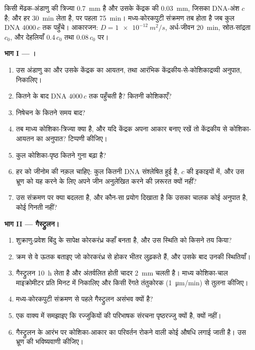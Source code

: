 \begin{problem}
\label{pb:b2:vertebrate-development:1}
किसी मेंढक-अंडाणु की त्रिज्या \qty{0.7}{mm} है और उसके केंद्रक की
\qty{0.03}{mm}, जिसका DNA-अंश $c$ है; और हर 
\qty{30}{min} लेता है, पर पहला \qty{75}{min}। मध्य-कोरकपुटी
संक्रमण तब होता है जब कुल DNA $4000\,c$ तक पहुँचे। आकारजन: $D =
\qty{1e-12}{m^2/s}$, अर्ध-जीवन \qty{20}{min}, स्रोत-सांद्रता
$c_0$, और देहलियाँ $0.4\,c_0$ तथा $0.08\,c_0$ पर।

\medskip
\noindent\textbf{भाग I --- ।}
\begin{enumerate}
  \item उस अंडाणु का और उसके केंद्रक का आयतन, तथा आरंभिक
        केंद्रकीय-से-कोशिकाद्रव्यी अनुपात, निकालिए।
  \item कितने  के बाद DNA $4000\,c$ तक पहुँचती है? कितनी
        कोशिकाएँ?
  \item निषेचन के कितने समय बाद?
  \item तब माध्य कोशिका-त्रिज्या क्या है, और यदि केंद्रक अपना आकार
        बनाए रखें तो केंद्रकीय से कोशिका-आयतन का अनुपात? टिप्पणी कीजिए।
  \item कुल कोशिका-पृष्ठ कितने गुना बढ़ा है?
  \item हर  को जीनोम की नक़ल चाहिए: कुल कितनी DNA
        संश्लेषित हुई है, $c$ की इकाइयों में, और उस भ्रूण को यह करने के
        लिए अपने जीन अनुलेखित करने की ज़रूरत क्यों नहीं?
  \item उस संक्रमण पर क्या बदलता है, और कौन-सा प्रयोग दिखाता है कि
        उसका चालक कोई अनुपात है, कोई गिनती नहीं?
\end{enumerate}

\medskip
\noindent\textbf{भाग II --- गैस्ट्रुलन।}
\begin{enumerate}[resume]
  \item शुक्राणु-प्रवेश बिंदु के सापेक्ष कोरकरंध्र कहाँ बनता है, और
        उस स्थिति को किसने तय किया?
  \item क्रम से वे ऊतक बताइए जो कोरकरंध्र से होकर भीतर लुढ़कते हैं, और
        उसके बाद उनकी स्थितियाँ।
  \item गैस्ट्रुलन \qty{10}{h} लेता है और अंतर्वलित होती चादर
        \qty{2}{mm} चलती है। माध्य कोशिका-चाल
        माइक्रोमीटर प्रति मिनट में निकालिए और किसी रेंगते
        तंतुकोरक (\qty{1}{\micro m/min}) से तुलना कीजिए।
  \item मध्य-कोरकपुटी संक्रमण से पहले गैस्ट्रुलन असंभव क्यों है?
  \item एक वाक्य में समझाइए कि रज्जुकियों की परिभाषक संरचना पृष्ठरज्जु
        क्यों है,  क्यों नहीं।
  \item गैस्ट्रुलन के आरंभ पर कोशिका-आकार का परिवर्तन रोकने वाली कोई
        औषधि लगाई जाती है। उस भ्रूण की भविष्यवाणी कीजिए।
\end{enumerate}


\end{problem}
